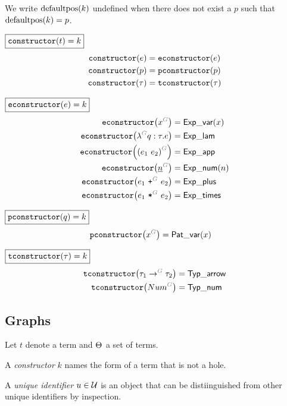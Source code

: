 We write $\defaultpos{k}$ undefined when there does not exist a $p$ such that $\defaultpos{k} = p$.

\noindent $\boxed{\constructor{t} = k}$
%
\begin{align*}
  \constructor{e} &= \econstructor{e} \\
  \constructor{p} &= \pconstructor{p} \\
  \constructor{\tau} &= \tconstructor{\tau}
\end{align*}

\noindent $\boxed{\econstructor{e} = k}$
%
\begin{align*}
  \econstructor{\eVar{G}{x}} &= \ExpVar(x) \\
  \econstructor{\eFun{G}{q}{\tau}{e}} &= \ExpLam \\
  \econstructor{\eApp{G}{e_1}{e_2}} &= \ExpApp \\
  \econstructor{\eNum{G}{n}} &= \ExpNum(n) \\
  \econstructor{\ePlus{G}{e_1}{e_2}} &= \ExpPlus \\
  \econstructor{\eTimes{G}{e_1}{e_2}} &= \ExpTimes
\end{align*}

\noindent $\boxed{\pconstructor{q} = k}$
%
\begin{align*}
  \pconstructor{\pVar{G}{x}} &= \PatVar(x)
\end{align*}

\noindent $\boxed{\tconstructor{\tau} = k}$
%
\begin{align*}
  \tconstructor{\tArrow{G}{\tau_1}{\tau_2}} &= \TypArrow \\
  \tconstructor{\tNum{G}} &= \TypNum
\end{align*}


\subsection{Graphs}

Let $t$ denote a term and $\Set$ a set of terms.

\begin{definition}
  A \emph{constructor} $k$ names the form of a term that is not a hole.
\end{definition}

\begin{definition}
  A \emph{unique identifier} $u \in \U$ is an object that can be distiinguished from other unique identifiers by inspection.
\end{definition}

